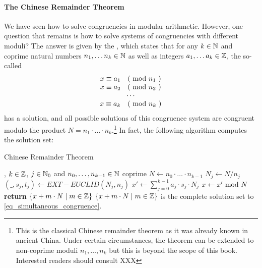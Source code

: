 \paragraph{The Chinese Remainder Theorem} We have seen how to solve congruencies in modular arithmetic. However, one question that remains is how to solve systems of congruencies with different moduli? The answer is given by the , which states that for any $ k \in \mathbb{N} $ and coprime natural numbers $ n_1, \ldots n_k \in \mathbb{N} $ as well as integers $ a_1, \ldots a_k \in \mathbb{Z} $, the so-called 
\begin{equation}
\label{eq_simultaneous_congruence}
\begin{array}{c}
x \equiv a_1 \quad \text{( mod } n_1 \text{ )} \\
x \equiv a_2 \quad \text{( mod } n_2 \text{ )} \\
\cdots \\
x \equiv a_k \quad \text{( mod } n_k \text{ )} \\
\end{array}
\end{equation}
has a solution, and all possible solutions of this congruence system are congruent modulo
the product $N= n_1 \cdot \ldots \cdot n_k $.\footnote{This is the classical Chinese remainder theorem as it was already known in ancient China. Under certain circumstances, the theorem can be extended to non-coprime moduli $ n_1, \ldots, n_k $ but this is beyond the scope of this book. Interested readers should consult XXX } In fact, the following algorithm computes the solution set: 
\begin{algorithm}\caption{Chinese Remainder Theorem}
\label{chinese-remainder-theorem}
\begin{algorithmic}[0]
\Require , $k\in \mathbb{Z}$, $j\in \mathbb{N}_0$ and $n_0,\ldots,n_{k-1} \in \mathbb{N}$ coprime
\State $N\gets n_0\cdot \ldots \cdot n_{k-1}$
\State $N_j\gets N/n_j$
\State $(\_,s_j,t_j)\gets EXT-EUCLID (N_j,n_j)$ 
\EndWhile
\State $x'\gets \sum_{j=0}^{k-1}a_j\cdot s_j\cdot N_j$
\State $x\gets x' \text{ mod } N$
\State \textbf{return} $\{x+ m\cdot N\;|\; m\in \mathbb{Z}\}$
\EndProcedure
\Ensure $\{x+ m\cdot N\;|\; m\in \mathbb{Z}\}$ is the complete solution set to \ref{eq_simultaneous_congruence}.
\end{algorithmic}
\end{algorithm}


